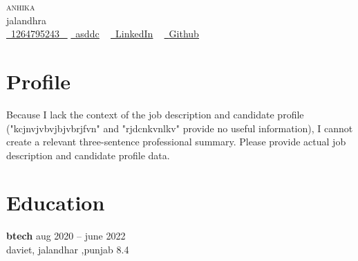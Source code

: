 \documentclass[letterpaper,11pt]{article}
\makeatletter
\newcommand{\resumeSubheading}[4]{
  \vspace{-2pt}\item
    \begin{tabular*}{1.0\textwidth}[t]{l@{\extracolsep{\fill}}r}
      \textbf{\large#1} & \textbf{\small #2} \\
      \textit{\large#3} & \textit{\small #4} \\
     
    \end{tabular*}\vspace{-7pt}
}
\newcommand{\resumeSubHeadingListStart}{\begin{itemize}[leftmargin=0.0in, label={}]}
\newcommand{\resumeSubHeadingListEnd}{\end{itemize}}
\makeatother
\begin{document}

\begin{center}
    {\Huge \scshape anhika} \\ \vspace{1pt}
    jalandhra \\ \vspace{1pt}
    \small 
    \small \href{1264795243}{ \raisebox{-0.1\height}\faPhone\ \underline{1264795243} ~} 
    \href{asddc}{\raisebox{-0.2\height}\faEnvelope\  \underline{asddc}} ~
    \href{aasdfc}{\raisebox{-0.2\height}\faLinkedinSquare\ \underline{LinkedIn}}  ~
    \href{HDBCJKVBLVJ}{\raisebox{-0.2\height}\faGithub\ \underline{Github}} ~
\end{center}
% 

\section{Profile}
Because I lack the context of the job description and candidate profile ("kcjnvjvbvjbjvbrjfvn" and "rjdcnkvnlkv" provide no useful information), I cannot create a relevant three-sentence professional summary.  Please provide actual job description and candidate profile data.




\section*{Education}
\textbf{btech} \hfill aug 2020 -- june 2022 \\[2pt]
daviet, jalandhar ,punjab \hfill 8.4 \\[6pt]




\end{document}
